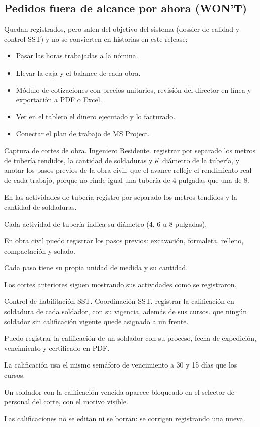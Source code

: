 \documentclass[11pt]{article}
\begin{document}
\subsection*{Pedidos fuera de alcance por ahora (WON'T)}

Quedan registrados, pero salen del objetivo del sistema (dossier de calidad y control SST) y no se convierten en historias en este release:

\begin{itemize}
  \item Pasar las horas trabajadas a la nómina.
  \item Llevar la caja y el balance de cada obra.
  \item Módulo de cotizaciones con precios unitarios, revisión del director en línea y exportación a PDF o Excel.
  \item Ver en el tablero el dinero ejecutado y lo facturado.
  \item Conectar el plan de trabajo de MS Project.
\end{itemize}

{Captura de cortes de obra.}
{Ingeniero Residente.}
{registrar por separado los metros de tubería tendidos, la cantidad de soldaduras y el diámetro de la tubería, y anotar los pasos previos de la obra civil.}
{que el avance refleje el rendimiento real de cada trabajo, porque no rinde igual una tubería de 4 pulgadas que una de 8.}
{\item En las actividades de tubería registro por separado los metros tendidos y la cantidad de soldaduras.
\item Cada actividad de tubería indica su diámetro (4, 6 u 8 pulgadas).
\item En obra civil puedo registrar los pasos previos: excavación, formaleta, relleno, compactación y solado.
\item Cada paso tiene su propia unidad de medida y su cantidad.
\item Los cortes anteriores siguen mostrando sus actividades como se registraron.}

{Control de habilitación SST.}
{Coordinación SST.}
{registrar la calificación en soldadura de cada soldador, con su vigencia, además de sus cursos.}
{que ningún soldador sin calificación vigente quede asignado a un frente.}
{\item Puedo registrar la calificación de un soldador con su proceso, fecha de expedición, vencimiento y certificado en PDF.
\item La calificación usa el mismo semáforo de vencimiento a 30 y 15 días que los cursos.
\item Un soldador con la calificación vencida aparece bloqueado en el selector de personal del corte, con el motivo visible.
\item Las calificaciones no se editan ni se borran: se corrigen registrando una nueva.}
\end{document}
